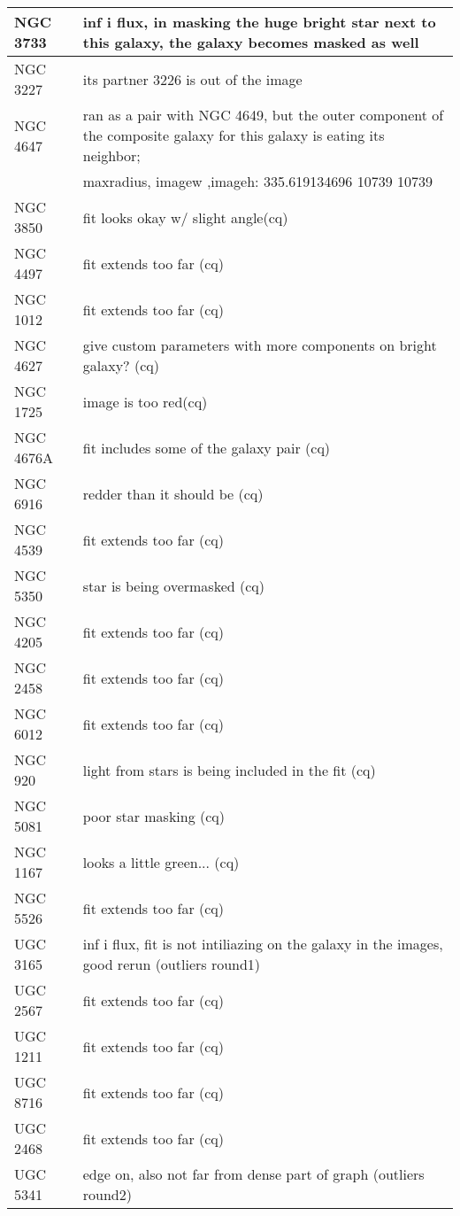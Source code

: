 \documentclass[10pt]{article}
\begin{document}
\begin{landscape}
\begin{longtable}{|l|l|}
NGC 3733 & inf i flux, in masking the huge bright star next to this galaxy, the galaxy becomes masked as well \\ \hline
NGC 3227 & its partner 3226 is out of the image\\ \hline
NGC 4647 & ran as a pair with NGC 4649, but the outer component of the composite galaxy for this galaxy is eating its neighbor;\\ \hline
 & maxradius, imagew ,imageh: 335.619134696 10739 10739 \\ \hline
NGC 3850 & fit looks okay w/ slight angle(cq)\\ \hline
NGC 4497 & fit extends too far (cq)\\ \hline
NGC 1012 & fit extends too far (cq)\\ \hline
NGC 4627 & give custom parameters with more components on bright galaxy? (cq) \\ \hline
NGC 1725 & image is too red(cq) \\ \hline
NGC 4676A & fit includes some of the galaxy pair (cq) \\ \hline
NGC 6916 & redder than it should be (cq) \\ \hline
NGC 4539 & fit extends too far (cq) \\ \hline
NGC 5350 & star is being overmasked (cq) \\ \hline
NGC 4205 & fit extends too far (cq)\\ \hline
NGC 2458 & fit extends too far (cq)\\ \hline
NGC 6012 & fit extends too far (cq)\\ \hline
NGC 920 & light from stars is being included in the fit (cq)\\ \hline
NGC 5081 & poor star masking (cq)\\ \hline
NGC 1167 & looks a little green... (cq)\\ \hline
NGC 5526 & fit extends too far (cq)\\ \hline
UGC 3165 & inf i flux, fit is not intiliazing on the galaxy in the images, good rerun (outliers round1)\\ \hline
UGC 2567 & fit extends too far (cq)\\ \hline
UGC 1211 & fit extends too far (cq)\\ \hline
UGC 8716 & fit extends too far (cq)\\ \hline
UGC 2468 & fit extends too far (cq)\\ \hline
UGC 5341 & edge on, also not far from dense part of graph (outliers round2)\\ \hline

\end{longtable}
\end{landscape}
\end{document}
